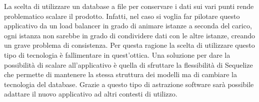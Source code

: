 \vspace{5mm}La scelta di utilizzare un database a file per conservare i dati sui vari punti rende problematico scalare il prodotto. Infatti, nel caso si voglia far pilotare questo applicativo da un load balancer\cite{LoadBalancing} in grado di animare istanze a seconda del carico, ogni istanza non sarebbe in grado di condividere dati con le altre istanze, creando un grave problema di consistenza. Per questa ragione la scelta di utilizzare questo tipo di tecnologia è fallimentare in quest'ottica. Una soluzione per dare la possibilità di scalare all'applicativo è quella di sfruttare la flessibilità di Sequelize\cite{Sequelize} che permette di mantenere la stessa struttura dei modelli ma di cambiare la tecnologia del database. Grazie a questo tipo di astrazione software sarà possibile adattare il nuovo applicativo ad altri contesti di utilizzo.









